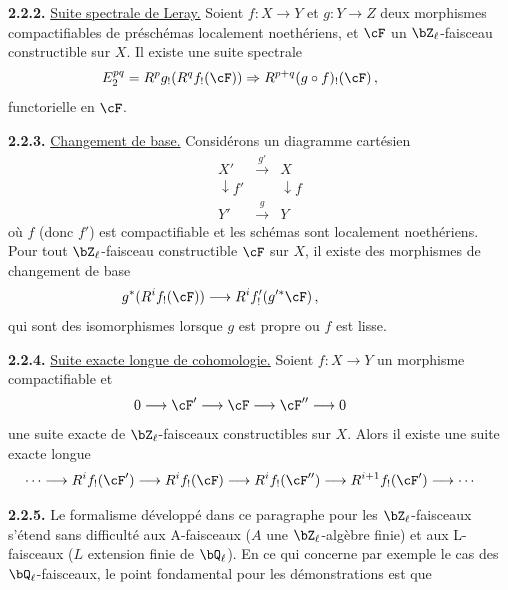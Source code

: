 \smallskip

\noindent
\textbf{2.2.2.} \underline{Suite spectrale de Leray.} Soient $f : X \rightarrow Y$ et $g : Y \rightarrow Z$ deux morphismes compactifiables de pr\'esch\'emas localement noeth\'eriens, et $\cF$ un $\bZ_{\ell}$-faisceau constructible sur $X$. Il existe une suite spectrale
\[
E_2^{pq} = R^p g_! (R^q f_! (\cF)) \Rightarrow R^{p+q}(g \circ f)_! (\cF)\,,\hspace*{1cm}
\]
functorielle en $\cF$.

\smallskip

\noindent
\textbf{2.2.3.} \underline{Changement de base.} Consid\'erons un diagramme cart\'esien
\[
\begin{array}{ccc}
X' & \xrightarrow{\;g'\;} & X \\
\downarrow{f'} & & \downarrow{f} \\
Y' & \xrightarrow{\;g\;} & Y
\end{array}
\]
o\`u $f$ (donc $f'$) est compactifiable et les sch\'emas sont localement noeth\'eriens. Pour tout $\bZ_{\ell}$-faisceau constructible $\cF$ sur $X$, il existe des morphismes de changement de base
\[
g^* (R^i f_! (\cF)) \longrightarrow R^i f'_! (g'^* \cF)\,,\hspace*{2cm}
\]
qui sont des isomorphismes lorsque $g$ est propre ou $f$ est lisse.

\smallskip

\noindent
\textbf{2.2.4.} \underline{Suite exacte longue de cohomologie.} Soient $f : X \rightarrow Y$ un morphisme compactifiable et
\[
0 \longrightarrow \cF' \longrightarrow \cF \longrightarrow \cF'' \longrightarrow 0\hspace*{1cm}
\]
une suite exacte de $\bZ_{\ell}$-faisceaux constructibles sur $X$. Alors il existe une suite exacte longue
\[
\cdots \longrightarrow R^i f_!(\cF') \longrightarrow R^i f_!(\cF) \longrightarrow R^i f_!(\cF'') \longrightarrow R^{i+1} f_!(\cF') \longrightarrow \cdots\hspace*{0.5cm}
\]

\smallskip

\noindent
\textbf{2.2.5.} Le formalisme d\'evelopp\'e dans ce paragraphe pour les $\bZ_{\ell}$-faisceaux s'\'etend sans difficult\'e aux A-faisceaux ($A$ une $\bZ_{\ell}$-alg\`ebre finie) et aux L-faisceaux ($L$ extension finie de $\bQ_{\ell}$). En ce qui concerne par exemple le cas des $\bQ_{\ell}$-faisceaux, le point fondamental pour les d\'emonstrations est que

\newpage


